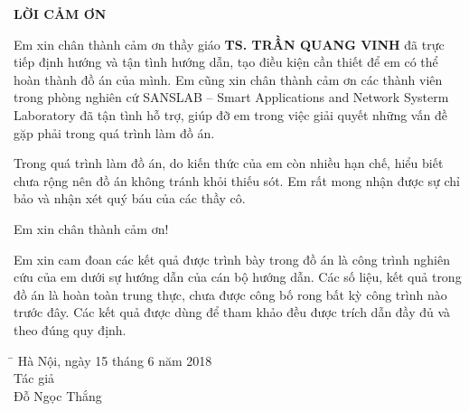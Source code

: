 \thispagestyle{plain}
\begin{center}
\textbf{LỜI CẢM ƠN} 
\end{center}
\vspace*{0.5cm}
Em xin chân thành cảm ơn thầy giáo \textbf{TS. TRẦN QUANG VINH} đã trực tiếp định hướng và tận tình hướng dẫn, tạo điều kiện cần thiết để em có thể hoàn thành đồ án của mình. Em cũng xin chân thành cảm ơn các thành viên trong phòng nghiên cứ SANSLAB – Smart Applications and Network Systerm Laboratory đã tận tình hỗ trợ, giúp đỡ em trong việc giải quyết những vấn đề gặp phải trong quá trình làm đồ án.\par
Trong quá trình làm đồ án, do kiến thức của em còn nhiều hạn chế, hiểu biết chưa rộng nên đồ án không tránh khỏi thiếu sót. Em rất mong nhận được sự chỉ bảo và nhận xét quý báu của các thầy cô. \par
Em xin chân thành cảm ơn! \par
Em xin cam đoan các kết quả được trình bày trong đồ án là công trình nghiên cứu của em dưới sự hướng dẫn của cán bộ hướng dẫn. Các số liệu, kết quả trong đồ án là hoàn toàn trung thực, chưa được công bố rong bất kỳ công trình nào trước đây. Các kết quả được dùng để tham khảo đều được trích dẫn đầy đủ và theo đúng quy định.
           
 \begin{tabbing}
 \hspace{9.5cm}\=\kill
   \>  Hà Nội, ngày 15 tháng 6 năm 2018\\ 
   \>  \hspace{2.7cm}    Tác giả\\ 
   \>   \hspace{2cm}  Đỗ Ngọc Thắng		
 \end{tabbing}